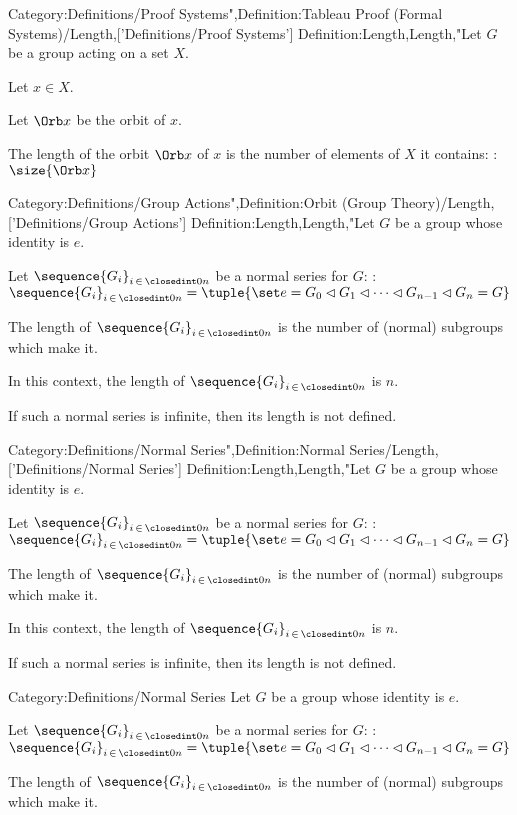 Category:Definitions/Proof Systems",Definition:Tableau Proof (Formal Systems)/Length,['Definitions/Proof Systems']
Definition:Length,Length,"Let $G$ be a group acting on a set $X$.

Let $x \in X$.


Let $\Orb x$ be the orbit of $x$.

The length of the orbit $\Orb x$ of $x$ is the number of elements of $X$ it contains:
:$\size {\Orb x}$


Category:Definitions/Group Actions",Definition:Orbit (Group Theory)/Length,['Definitions/Group Actions']
Definition:Length,Length,"Let $G$ be a group whose identity is $e$.

Let $\sequence {G_i}_{i \mathop \in \closedint 0 n}$ be a normal series for $G$:
:$\sequence {G_i}_{i \mathop \in \closedint 0 n} = \tuple {\set e = G_0 \lhd G_1 \lhd \cdots \lhd G_{n-1} \lhd G_n = G}$


The length of $\sequence {G_i}_{i \mathop \in \closedint 0 n}$ is the number of (normal) subgroups which make it.

In this context, the length of $\sequence {G_i}_{i \mathop \in \closedint 0 n}$ is $n$.


If such a normal series is infinite, then its length is not defined.


Category:Definitions/Normal Series",Definition:Normal Series/Length,['Definitions/Normal Series']
Definition:Length,Length,"Let $G$ be a group whose identity is $e$.

Let $\sequence {G_i}_{i \mathop \in \closedint 0 n}$ be a normal series for $G$:
:$\sequence {G_i}_{i \mathop \in \closedint 0 n} = \tuple {\set e = G_0 \lhd G_1 \lhd \cdots \lhd G_{n-1} \lhd G_n = G}$


The length of $\sequence {G_i}_{i \mathop \in \closedint 0 n}$ is the number of (normal) subgroups which make it.

In this context, the length of $\sequence {G_i}_{i \mathop \in \closedint 0 n}$ is $n$.


If such a normal series is infinite, then its length is not defined.


Category:Definitions/Normal Series
Let $G$ be a group whose identity is $e$.

Let $\sequence {G_i}_{i \mathop \in \closedint 0 n}$ be a normal series for $G$:
:$\sequence {G_i}_{i \mathop \in \closedint 0 n} = \tuple {\set e = G_0 \lhd G_1 \lhd \cdots \lhd G_{n-1} \lhd G_n = G}$


The length of $\sequence {G_i}_{i \mathop \in \closedint 0 n}$ is the number of (normal) subgroups which make it.

